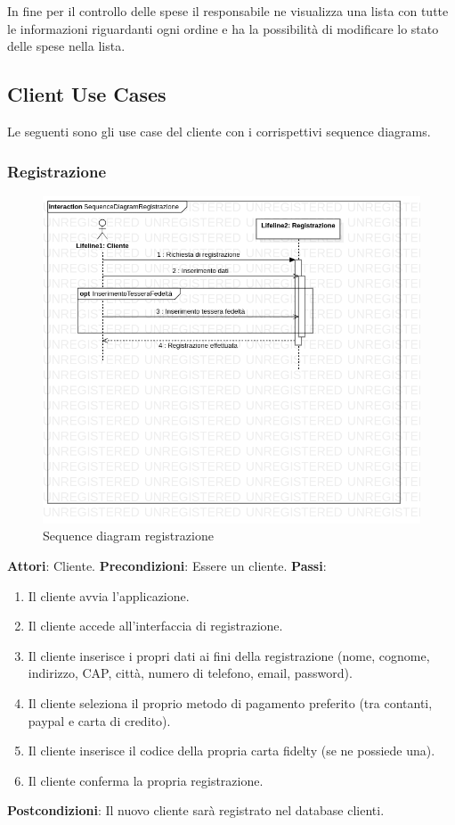 \documentclass[12pt, a4paper]{report}
\begin{document}
In fine per il controllo delle spese il responsabile ne visualizza una lista
con tutte le informazioni riguardanti ogni ordine e ha la possibilità di
modificare lo stato delle spese nella lista.

\newpage

\subsection{Client Use Cases}

Le seguenti sono gli use case del cliente con i corrispettivi sequence diagrams.

\subsubsection{Registrazione}

\begin{figure}[h]
  \centering
  \includegraphics[width=\textwidth]{Use Case Model!Registrazione!InteractionRegistrazione!SequenceDiagramRegistrazione_1.png}
  \caption{Sequence diagram registrazione}
\end{figure}
\break
\textbf{Attori}: Cliente.\newline
\textbf{Precondizioni}: Essere un cliente. \newline
\textbf{Passi}: 
\begin{enumerate}
\item Il cliente avvia l'applicazione.
\item Il cliente accede all'interfaccia di registrazione.
\item Il cliente inserisce i propri dati ai fini della registrazione (nome, cognome, indirizzo, CAP, città, numero di telefono, email, password).
\item Il cliente seleziona il proprio metodo di pagamento preferito (tra contanti, paypal e carta di credito).
\item Il cliente inserisce il codice della propria carta fidelty (se ne possiede una).
\item Il cliente conferma la  propria registrazione.
\end{enumerate}
\textbf{Postcondizioni}: Il nuovo cliente sarà registrato nel database clienti.
\break
\end{document}
